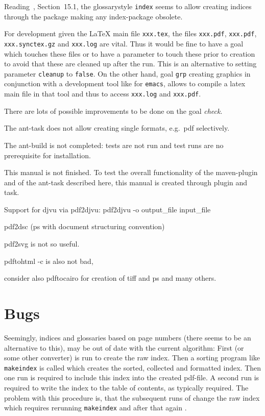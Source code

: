 \documentclass[a4paper,12pt,german,english]{book}
\begin{document}
Reading~\cite{GloP}, Section~15.1, the glossarystyle \texttt{index} 
seems to allow creating indices through the  package 
making any index-package obsolete. 

For development given the \LaTeX{} main file \texttt{xxx.tex}, 
the files \texttt{xxx.pdf}, \texttt{xxx.pdf}, \texttt{xxx.synctex.gz} 
and \texttt{xxx.log} are vital. 
Thus it would be fine to have a goal which touches these files 
or to have a parameter to touch these prior to creation 
to avoid that these are cleaned up after the run. 
This is an alternative to setting parameter \texttt{cleanup} to \texttt{false}. 
On the other hand, goal \texttt{grp} creating graphics 
in conjunction with a development tool like \auctex{} for \texttt{emacs}, 
allows to compile a latex main file in that tool 
and thus to access \texttt{xxx.log} and \texttt{xxx.pdf}. 

There are lots of possible improvements to be done on the goal \emph{check}. 


The ant-task does not allow creating single formats, e.g.~pdf selectively. 

The ant-build is not completed: tests are not run and 
test runs are no prerequisite for installation. 

This manual is not finished. 
To test the overall functionality of the maven-plugin and of the ant-task 
described here, this manual is created through plugin and task. 

Support for djvu via pdf2djvu: 
pdf2djvu -o output\_file input\_file

pdf2dsc
(ps with document structuring convention) 

pdf2svg is not so useful. 

pdftohtml -c is also not bad, 

consider also pdftocairo for creation of tiff and ps and many others. 

\chapter{Bugs}\label{chap:bugs}

Seemingly, indices and glossaries based on page numbers 
(there seems to be an alternative to this), 
may be out of date with the current algorithm: 
First \lualatex{} (or some other converter) is run to create the raw index. 
Then a sorting program like \texttt{makeindex} is called 
which creates the sorted, collected and formatted index. 
Then one \lualatex{} run is required to include this index 
into the created pdf-file. 
A second \lualatex{} run is required 
to write the index to the table of contents, as typically required. 
The problem with this procedure is, 
that the subsequent runs of \lualatex{} change the raw index 
which requires rerunning \texttt{makeindex} 
and after that again \lualatex. 
\end{document}
